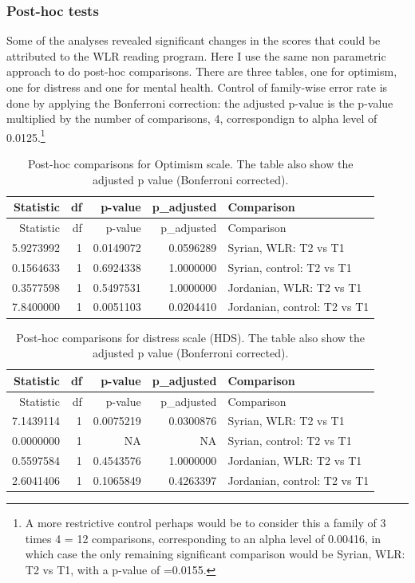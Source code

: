 \documentclass[]{article}
\begin{document}
\newpage

\hypertarget{post-hoc-tests}{%
\subsubsection{Post-hoc tests}\label{post-hoc-tests}}

Some of the analyses revealed significant changes in the scores that
could be attributed to the WLR reading program. Here I use the same non
parametric approach to do post-hoc comparisons. There are three tables,
one for optimism, one for distress and one for mental health. Control of
family-wise error rate is done by applying the Bonferroni correction:
the adjusted p-value is the p-value multiplied by the number of
comparisons, 4, correspondign to alpha level of 0.0125.\footnote{A more
  restrictive control perhaps would be to consider this a family of 3
  times 4 = 12 comparisons, corresponding to an alpha level of 0.00416,
  in which case the only remaining significant comparison would be
  Syrian, WLR: T2 vs T1, with a p-value of =0.0155.}

\begin{longtable}[]{@{}rrrrl@{}}
\caption{Post-hoc comparisons for Optimism scale. The table also show
the adjusted p value (Bonferroni corrected).}\tabularnewline
\toprule
Statistic & df & p-value & p\_adjusted & Comparison\tabularnewline
\midrule
\endfirsthead
\toprule
Statistic & df & p-value & p\_adjusted & Comparison\tabularnewline
\midrule
\endhead
5.9273992 & 1 & 0.0149072 & 0.0596289 & Syrian, WLR: T2 vs
T1\tabularnewline
0.1564633 & 1 & 0.6924338 & 1.0000000 & Syrian, control: T2 vs
T1\tabularnewline
0.3577598 & 1 & 0.5497531 & 1.0000000 & Jordanian, WLR: T2 vs
T1\tabularnewline
7.8400000 & 1 & 0.0051103 & 0.0204410 & Jordanian, control: T2 vs
T1\tabularnewline
\bottomrule
\end{longtable}

\begin{longtable}[]{@{}rrrrl@{}}
\caption{Post-hoc comparisons for distress scale (HDS). The table also
show the adjusted p value (Bonferroni corrected).}\tabularnewline
\toprule
Statistic & df & p-value & p\_adjusted & Comparison\tabularnewline
\midrule
\endfirsthead
\toprule
Statistic & df & p-value & p\_adjusted & Comparison\tabularnewline
\midrule
\endhead
7.1439114 & 1 & 0.0075219 & 0.0300876 & Syrian, WLR: T2 vs
T1\tabularnewline
0.0000000 & 1 & NA & NA & Syrian, control: T2 vs T1\tabularnewline
0.5597584 & 1 & 0.4543576 & 1.0000000 & Jordanian, WLR: T2 vs
T1\tabularnewline
2.6041406 & 1 & 0.1065849 & 0.4263397 & Jordanian, control: T2 vs
T1\tabularnewline
\bottomrule
\end{longtable}
\end{document}
